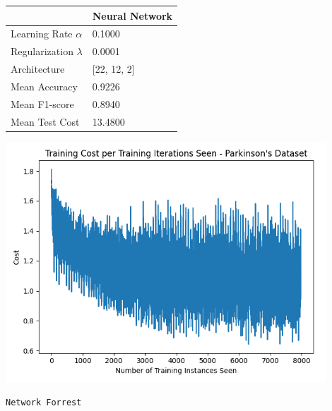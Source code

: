 \documentclass{article}
\begin{document}
\begin{minipage}{0.49\textwidth}
    \centering
    
    \begin{tabular}{ll}
        \toprule
        & Neural Network \\
        \midrule
        Learning Rate $\alpha$ & 0.1000 \\
        Regularization $\lambda$ & 0.0001 \\
        Architecture & [22, 12, 2] \\
        Mean Accuracy & 0.9226 \\
        Mean F1-score & 0.8940 \\
        Mean Test Cost & 13.4800 \\
        \bottomrule
    \end{tabular}

        
\end{minipage}
\hfill
\begin{minipage}{0.49\textwidth}
    \centering
    \includegraphics*[width=0.9\textwidth]{./src/figures/Parkinson's_train_cost.png}
\end{minipage}
\newpage
\begin{center}
    \texttt{Network Forrest}
\end{center}
\end{document}
